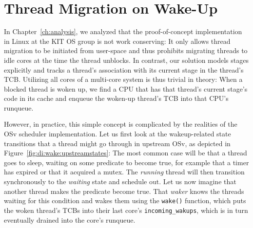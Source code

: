 \documentclass[12pt,a4paper]{book}
\begin{document}
\section{Thread Migration on Wake-Up}\label{ch:di:wake}
In Chapter~\ref{ch:analysis}, we analyzed that the proof-of-concept implementation in Linux at the KIT OS group is not work conserving:
It only allows thread migration to be initiated from user-space and thus prohibits migrating threads to idle cores at the time the thread unblocks.
In contrast, our solution models stages explicitly and tracks a thread's association with its current stage in the thread's TCB.
Utilizing all cores of a multi-core system is thus trivial in theory:
When a blocked thread is woken up, we find a CPU that has that thread's current stage's code in its cache and enqueue the woken-up thread's TCB into that CPU's runqueue.

However, in practice, this simple concept is complicated by the realities of the OSv scheduler implementation.
Let us first look at the wakeup-related state transitions that a thread might go through in upstream OSv, as depicted in Figure~\ref{fig:di:wake:upstreamstates}:
The most common case will be that a thread goes to sleep, waiting on some predicate to become true, for example that a timer has expired or that it acquired a mutex.
The \textit{running} thread will then transition synchronously to the \textit{waiting} state and schedule out.
Let us now imagine that another thread makes the predicate become true.
That \emph{waker} knows the threads waiting for this condition and wakes them using the \lstinline[style=figurecpp]{wake()} function, which puts the woken thread's TCBs into their last core's \lstinline[style=figurecpp]{incoming_wakups}, which is in turn eventually drained into the core's runqueue.
\end{document}
